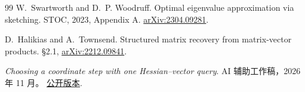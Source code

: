 \documentclass[UTF8,11pt,fontset=windows]{ctexart}
\begin{document}
{\begin{thebibliography}{99}
W.~Swartworth and D.~P. Woodruff.
\newblock Optimal eigenvalue approximation via sketching.
\newblock STOC, 2023, Appendix A.
\newblock \href{https://arxiv.org/abs/2304.09281}{arXiv:2304.09281}.

D.~Halikias and A.~Townsend.
\newblock Structured matrix recovery from matrix-vector products.
\newblock \S2.1, \href{https://arxiv.org/abs/2212.09841}{arXiv:2212.09841}.

\emph{Choosing a coordinate step with one Hessian--vector query}.
\newblock AI 辅助工作稿，2026 年 11 月。
\newblock \href{https://taitai2025.github.io/assets/documents/research/coordinate-query.pdf}{公开版本}.
\end{thebibliography}
}
\end{document}
